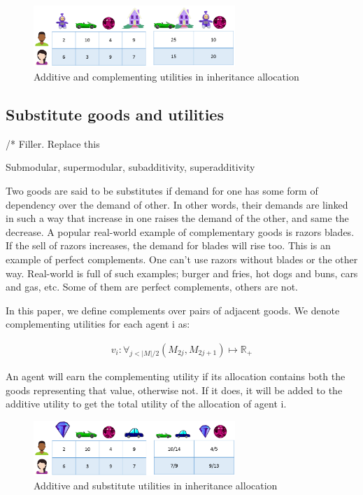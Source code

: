 \begin{figure}
\includegraphics[width=3in]{images/complementary_values.png}
\caption{Additive and complementing utilities in inheritance allocation}
\end{figure}


\subsection{Substitute goods and utilities}
\label{section_substitute}

/* Filler. Replace this

Submodular, supermodular, subadditivity, superadditivity

Two goods are said to be substitutes if demand for one has some form of dependency over the demand of other. In other words, their demands are linked in such a way that increase in one raises the demand of the other, and same the decrease. A popular real-world example of complementary goods is razors blades. If the sell of razors increases, the demand for blades will rise too. This is an example of perfect complements. One can't use razors without blades or the other way. Real-world is full of such examples; burger and fries, hot dogs and buns, cars and gas, etc. Some of them are perfect complements, others are not.

In this paper, we define complements over pairs of adjacent goods. We denote complementing utilities for each agent i as: 

\begin{gather}
    v_i: \forall_{j < |M|/2} (M_{2j}, M_{2j+1})\mapsto \mathbb{R_+}
\end{gather}

An agent will earn the complementing utility if its allocation contains both the goods representing that value, otherwise not. If it does, it will be added to the additive utility to get the total utility of the allocation of agent i.

\begin{figure}
\includegraphics[width=3in]{images/substitute_values.png}
\caption{Additive and substitute utilities in inheritance allocation}
\end{figure}

